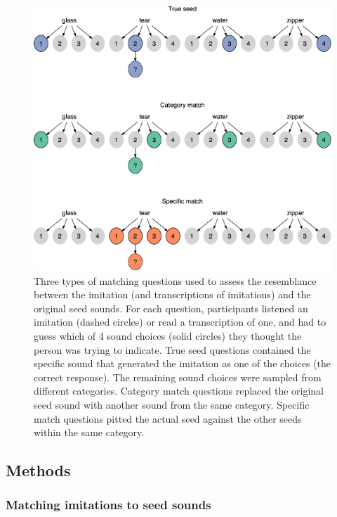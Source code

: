 \documentclass[english,floatsintext,man]{apa6}
\theoremstyle{definition}
\theoremstyle{definition}
\theoremstyle{definition}
\theoremstyle{remark}
\begin{document}
\begin{figure}
\centering
\includegraphics{fig4-1.pdf}
\caption{\label{fig:fig4}Three types of matching questions used to assess
the resemblance between the imitation (and transcriptions of imitations)
and the original seed sounds. For each question, participants listened
an imitation (dashed circles) or read a transcription of one, and had to
guess which of 4 sound choices (solid circles) they thought the person
was trying to indicate. True seed questions contained the specific sound
that generated the imitation as one of the choices (the correct
response). The remaining sound choices were sampled from different
categories. Category match questions replaced the original seed sound
with another sound from the same category. Specific match questions
pitted the actual seed against the other seeds within the same
category.}
\end{figure}

\hypertarget{methods-1}{%
\subsection{Methods}\label{methods-1}}

\hypertarget{matching-imitations-to-seed-sounds}{%
\subsubsection{Matching imitations to seed
sounds}\label{matching-imitations-to-seed-sounds}}
\end{document}
